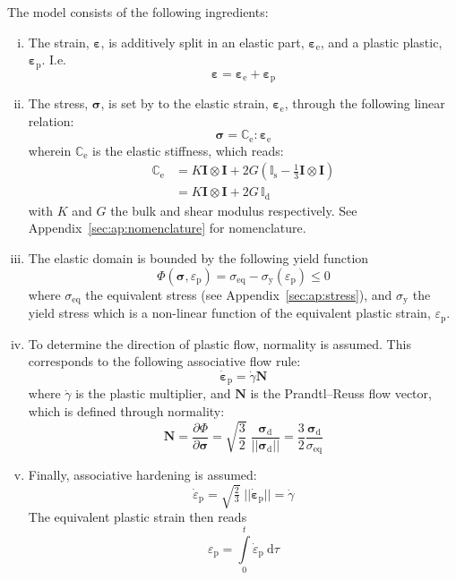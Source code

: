 \documentclass[times]{goose-article}
\begin{document}
The model consists of the following ingredients:
\begin{enumerate}[(i)]
\item The strain, $\bm{\varepsilon}$, is additively split in an elastic part, $\bm{\varepsilon}_\mathrm{e}$, and a plastic plastic, $\bm{\varepsilon}_\mathrm{p}$. I.e.
\begin{equation}
  \bm{\varepsilon}
  = \bm{\varepsilon}_\mathrm{e}
  + \bm{\varepsilon}_\mathrm{p}
\end{equation}
\item The stress, $\bm{\sigma}$, is set by to the elastic strain, $\bm{\varepsilon}_\mathrm{e}$, through the following linear relation:
\begin{equation}
  \bm{\sigma}
  = \mathbb{C}_\mathrm{e} : \bm{\varepsilon}_\mathrm{e}
\end{equation}
wherein $\mathbb{C}_\mathrm{e}$ is the elastic stiffness, which reads:
\begin{align}
  \mathbb{C}_\mathrm{e}
  &= K \bm{I} \otimes \bm{I}
   + 2 G (\mathbb{I}_\mathrm{s} - \tfrac{1}{3} \bm{I} \otimes \bm{I} )
  \\
  &= K \bm{I} \otimes \bm{I}
  + 2 G \, \mathbb{I}_\mathrm{d}
\end{align}
with $K$ and $G$ the bulk and shear modulus respectively. See Appendix~\ref{sec:ap:nomenclature} for nomenclature.
\item The elastic domain is bounded by the following yield function
\begin{equation}
  \Phi( \bm{\sigma} , \varepsilon_\mathrm{p} )
  = \sigma_\mathrm{eq}
  - \sigma_\mathrm{y} (\varepsilon_\mathrm{p}) \leq 0
\end{equation}
where $\sigma_\mathrm{eq}$ the equivalent stress (see Appendix~\ref{sec:ap:stress}), and $\sigma_\mathrm{y}$ the yield stress which is a non-linear function of the equivalent plastic strain, $\varepsilon_\mathrm{p}$.
\item To determine the direction of plastic flow, normality is assumed. This corresponds to the following associative flow rule:
\begin{equation}
  \dot{\bm{\varepsilon}}_\mathrm{p}
  = \dot{\gamma} \bm{N}
\end{equation}
where $\dot{\gamma}$ is the plastic multiplier, and $\bm{N}$ is the Prandtl--Reuss flow vector, which is defined through normality:
\begin{equation}
  \bm{N}
  = \frac{\partial \Phi}{\partial \bm{\sigma}}
  = \sqrt{\frac{3}{2}} \;
    \frac{\bm{\sigma}_\mathrm{d}}{|| \bm{\sigma}_\mathrm{d} ||}
  = \frac{3}{2}
    \frac{\bm{\sigma}_\mathrm{d}}{\sigma_\mathrm{eq}}
\end{equation}
\item Finally, associative hardening is assumed:
\begin{equation}
  \dot{\varepsilon}_\mathrm{p}
  = \sqrt{\tfrac{2}{3}} \;
    \big|\big| \dot{\bm{\varepsilon}}_\mathrm{p} \big|\big|
  = \dot{\gamma}
\end{equation}
The equivalent plastic strain then reads
\begin{equation}
  \varepsilon_\mathrm{p} =
  \int\limits_0^t \dot{\varepsilon}_\mathrm{p} ~\mathrm{d}\tau
\end{equation}
\end{enumerate}
\end{document}
